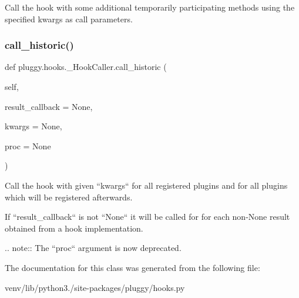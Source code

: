 \begin{DoxyVerb}Call the hook with some additional temporarily participating
methods using the specified kwargs as call parameters. \end{DoxyVerb}
 \mbox{\label{classpluggy_1_1hooks_1_1___hook_caller_a4080f2f853664dcb18c46ab6638b23e6}} 
\subsubsection{\texorpdfstring{call\+\_\+historic()}{call\_historic()}}
{\footnotesize\ttfamily def pluggy.\+hooks.\+\_\+\+Hook\+Caller.\+call\+\_\+historic (\begin{DoxyParamCaption}\item[{}]{self,  }\item[{}]{result\+\_\+callback = {\ttfamily None},  }\item[{}]{kwargs = {\ttfamily None},  }\item[{}]{proc = {\ttfamily None} }\end{DoxyParamCaption})}

\begin{DoxyVerb}Call the hook with given ``kwargs`` for all registered plugins and
for all plugins which will be registered afterwards.

If ``result_callback`` is not ``None`` it will be called for for each
non-None result obtained from a hook implementation.

.. note::
    The ``proc`` argument is now deprecated.
\end{DoxyVerb}
 

The documentation for this class was generated from the following file\+:\begin{DoxyCompactItemize}
\item 
venv/lib/python3./site-\/packages/pluggy/hooks.\+py\end{DoxyCompactItemize}
